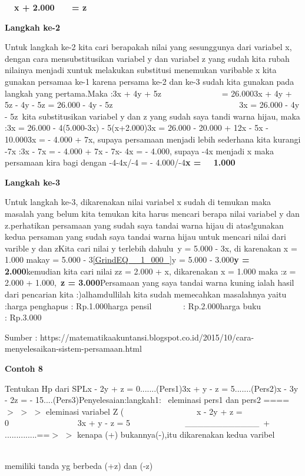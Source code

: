 \documentclass[11pt,fleqn]{book} %
\begin{document}
\begin{myEnumerate}
\begin{itemize}
\noindent \textbf{~~x + 2.000~~~ = z}

\noindent \textbf{Langkah ke-2}

\noindent Untuk langkah ke-2 kita cari berapakah nilai yang sesunggunya dari variabel x, dengan cara mensubstitusikan variabel y dan variabel z yang sudah kita rubah nilainya menjadi xuntuk melakukan substitusi menemukan varibable x kita gunakan persamaa ke-1 karena persama ke-2 dan ke-3 sudah kita gunakan pada langkah yang pertama.Maka :3x + 4y + 5z~~~~~~~~~~~~~~ = 26.0003x + 4y + 5z - 4y - 5z = 26.000 - 4y - 5z~~~~~~~~~~~~~~~~~~~~~~~~~~~~~~ 3x = 26.000 - 4y - 5z~kita substitusikan variabel y dan z yang sudah saya tandi warna hijau, maka :3x = 26.000 - 4(5.000-3x) - 5(x+2.000)3x = 26.000 - 20.000 + 12x - 5x - 10.0003x = - 4.000 + 7x, supaya persamaan menjadi lebih sederhana kita kurangi -7x :3x - 7x = - 4.000 + 7x - 7x- 4x = - 4.000, supaya -4x menjadi x maka persamaan kira bagi dengan -4-4x/-4 = - 4.000/-4\textbf{x =~~ 1.000}

\noindent \textbf{Langkah ke-3}

\noindent Untuk langkah ke-3, dikarenakan nilai variabel x sudah di temukan maka masalah yang belum kita temukan kita harus mencari berapa nilai variabel y dan z.perhatikan persamaan yang sudah saya tandai warna hijau di atas!gunakan kedua persaman yang sudah saya tandai warna hijau untuk mencari nilai dari varible y dan zKita cari nilai y terlebih dahulu~y = 5.000 - 3x, di karenakan x = 1.000 makay = 5.000 - 3\eqref{GrindEQ__1_000_}y = 5.000 - 3.000\textbf{y = 2.000}kemudian kita cari nilai zz = 2.000 + x, dikarenakan x = 1.000 maka :z = 2.000 + 1.000,~\textbf{z = 3.000}Persamaan yang saya tandai warna kuning ialah hasil dari pencarian kita :)alhamdullilah kita sudah memecahkan masalahnya yaitu :harga penghapus : Rp.1.000harga pensil~~~~~~~ : Rp.2.000harga buku~~~~~~~~~ : Rp.3.000

\noindent Sumber : https://matematikaakuntansi.blogspot.co.id/2015/10/cara-menyelesaikan-sistem-persamaan.html

\noindent \textbf{Contoh 8}

\noindent Tentukan Hp dari SPLx - 2y + z = 0.......(Pers1)3x + y - z = 5.......(Pers2)x - 3y - 2z = - 15....(Pers3)Penyelesaian:langkah1:~ eleminasi pers1 dan pers2 ==== $>$ $>$ $>$ eleminasi variabel Z (~~~~~~~~~~~~~~~~~ x - 2y + z = 0~~~~~~~~~~~~~~~~ 3x + y - z = 5~ ~ ~ ~ ~ ~ ~ ~ \_\_\_\_\_\_\_\_\_\_\_\_~+ ~~ ..............==$>$ $>$ kenapa (+) bukannya(-),itu dikarenakan kedua varibel

\noindent ~~~~~~~~~~~~~~~~~~~~~~~~~~~~~~~~~~~~~~~~~~~~~~~~~~~~~~~~~~~~~~~~~~~~~~~ memiliki tanda yg berbeda (+z) dan (-z)


\end{itemize}
\end{myEnumerate}
\end{document}
